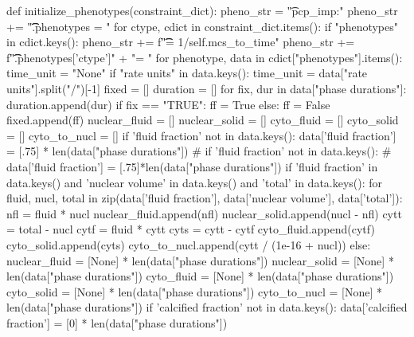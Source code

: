 \begin{python}
def initialize_phenotypes(constraint_dict):
    pheno_str = "\n\t\tif pcp_imp:\n"
    pheno_str += "\t\t\tself.phenotypes = {}\n"
    for ctype, cdict in constraint_dict.items():
        if "phenotypes" in cdict.keys():
            pheno_str += f"\t\t\tdt = 1/self.mcs_to_time\n"
            pheno_str += f"\t\t\tself.phenotypes['{ctype}']" + "= {}\n"
            for phenotype, data in cdict["phenotypes"].items():
                time_unit = "None"
                if "rate units" in data.keys():
                    time_unit = data["rate units"].split("/")[-1]
                fixed = []
                duration = []
                for fix, dur in data["phase durations"]:
                    duration.append(dur)
                    if fix == "TRUE":
                        ff = True
                    else:
                        ff = False
                    fixed.append(ff)
                nuclear_fluid = []
                nuclear_solid = []
                cyto_fluid = []
                cyto_solid = []
                cyto_to_nucl = []
                if 'fluid fraction' not in data.keys():
                    data['fluid fraction'] = [.75] * len(data["phase durations"])
                # if 'fluid fraction' not in data.keys():
                #     data['fluid fraction'] = [.75]*len(data["phase durations"])
                if 'fluid fraction' in data.keys() and 'nuclear volume' in data.keys() and 'total' in data.keys():
                    for fluid, nucl, total in zip(data['fluid fraction'], data['nuclear volume'], data['total']):
                        nfl = fluid * nucl
                        nuclear_fluid.append(nfl)
                        nuclear_solid.append(nucl - nfl)
                        cytt = total - nucl
                        cytf = fluid * cytt
                        cyts = cytt - cytf
                        cyto_fluid.append(cytf)
                        cyto_solid.append(cyts)
                        cyto_to_nucl.append(cytt / (1e-16 + nucl))
                else:
                    nuclear_fluid = [None] * len(data["phase durations"])
                    nuclear_solid = [None] * len(data["phase durations"])
                    cyto_fluid = [None] * len(data["phase durations"])
                    cyto_solid = [None] * len(data["phase durations"])
                    cyto_to_nucl = [None] * len(data["phase durations"])
                if 'calcified fraction' not in data.keys():
                    data['calcified fraction'] = [0] * len(data["phase durations"])


\end{python}
